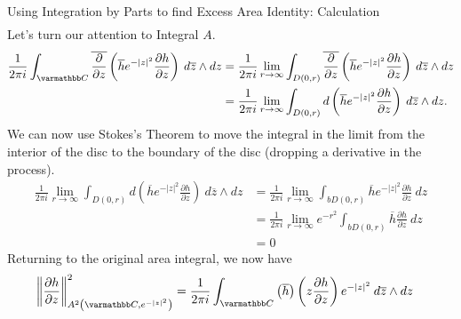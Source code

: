 \documentclass{reu_beamer}
\begin{document}
\begin{frame}[allowframebreaks]{Using Integration by Parts to find Excess Area Identity: Calculation}
\begin{align*}
  \end{align*}
  Let's turn our attention to Integral $A$.
  \begin{align*}
    \frac{1}{2\pi i}\int_{\C}^{} \overline{\frac{\partial }{\partial z}}\left(\overline{h}e^{-|z|^2}\frac{\partial h}{\partial z}\right)\:d\overline{z}\wedge dz &= \frac{1}{2\pi i}\lim_{r\rightarrow\infty} \int_{D(0,r)}^{} \overline{\frac{\partial }{\partial z}}\left(\overline{h}e^{-|z|^2}\frac{\partial h}{\partial z}\right)\:d\overline{z}\wedge dz\\
                                                                                                                                                                                         &= \frac{1}{2\pi i } \lim_{r\rightarrow\infty}\int_{D(0,r)}^{} d\left(\overline{h}e^{-|z|^2}\frac{\partial h}{\partial z}\right)\:d\overline{z}\wedge dz.
  \end{align*}
  We can now use Stokes's Theorem to move the integral in the limit from the interior of the disc to the boundary of the disc (dropping a derivative in the process).
  \begin{align*}
    \frac{1}{2\pi i } \lim_{r\rightarrow\infty}\int_{D(0,r)}^{} d\left(\overline{h}e^{-|z|^2}\frac{\partial h}{\partial z}\right)\:d\overline{z}\wedge dz &= \frac{1}{2\pi i}\lim_{r\rightarrow\infty}\int_{b D(0,r)}^{} \overline{h}e^{-|z|^2}\frac{\partial h}{\partial z}\:dz\\
                                                                                                                                                                    &= \frac{1}{2\pi i}\lim_{r\rightarrow\infty}e^{-r^2}\int_{bD(0,r)}^{} \overline{h}\frac{\partial h}{\partial z}\:dz\\
                                                                                                                                                                                                                                                                                                                                                                                                                                                                                                                                                                    &= 0
  \end{align*}
  Returning to the original area integral, we now have
  \begin{align*}
    \norm{\frac{\partial h}{\partial z}}_{A^{2}\left(\C,e^{-|z|^2}\right)}^{2}&= \frac{1}{2\pi i}\int_{\C}^{} \left(\overline{h}\right)\left(z\frac{\partial h}{\partial z}\right)e^{-|z|^2}\:d\overline{z}\wedge dz
  \end{align*}
\end{frame}
\end{document}
